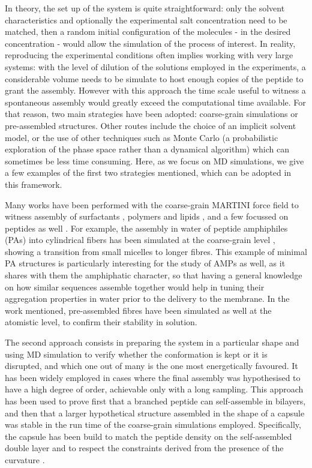 In theory, the set up of the system is quite straightforward: only the solvent characteristics and optionally the experimental salt concentration need to be matched, then a random initial configuration of the molecules - in the desired concentration - would allow the simulation of the process of interest.
%
In reality, reproducing the experimental conditions often implies working with very large systems: with the level of dilution of the solutions employed in the experiments, a considerable volume needs to be simulate to host enough copies of the peptide to grant the assembly.
%
However with this approach the time scale useful to witness a spontaneous assembly would greatly exceed the computational time available. For that reason, two main strategies have been adopted: coarse-grain simulations or pre-assembled structures. Other routes include the choice of an implicit solvent model, or the use of other techniques such as Monte Carlo (a probabilistic exploration of the phase space rather than a dynamical algorithm) which can sometimes be less time consuming. Here, as we focus on MD simulations, we give a few examples of the first two strategies mentioned, which can be adopted in this framework.

Many works have been performed with the coarse-grain MARTINI force field to witness assembly of surfactants \cite{Wu2012}, polymers \cite{Wang2012poly,Bochicchio2017} and lipids \cite{Lee2011,Brocos2012}, and a few focussed on peptides as well \cite{Guo2012,Seo2012}.
%
For example, the assembly in water of peptide amphiphiles (PAs) into cylindrical fibers has been simulated at the coarse-grain level \cite{Lee2012}, showing a transition from small micelles to longer fibres. This example of minimal PA structures is particularly interesting for the study of AMPs as well, as it shares with them the amphiphatic character, so that having a general knowledge on how similar sequences assemble together would help in tuning their aggregation properties in water prior to the delivery to the membrane.
%
In the work mentioned, pre-assembled fibres have been simulated as well at the atomistic level, to confirm their stability in solution.

The second approach consists in preparing the system in a particular shape and using MD simulation to verify whether the conformation is kept or it is disrupted, and which one out of many is the one most energetically favoured. It has been widely employed in cases where the final assembly was hypothesised to have a high degree of order, achievable only with a long sampling. 
%
This approach has been used to prove first that a branched peptide can self-assemble in bilayers, and then that a larger hypothetical structure assembled in the shape of a capsule was stable in the run time of the coarse-grain simulations employed. Specifically, the capsule has been build to match the peptide density on the self-assembled double layer and to respect the constraints derived from the presence of the curvature \cite{Gudlur2012}.

